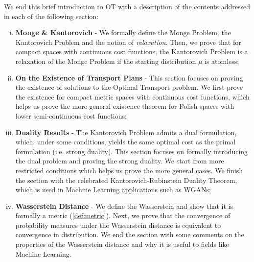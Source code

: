 We end this brief introduction to OT with a description of
the contents addressed in each of the following section:
\begin{enumerate}[(i)]
  \item \textbf{Monge \& Kantorovich} - We formally define the Monge Problem, the Kantorovich Problem
  and the notion of \textit{relaxation}. Then, we prove that for compact spaces with continuous cost functions,
  the Kantorovich Problem is a relaxation of the Monge Problem if the starting distribution $\mu$ is atomless;

  \item \textbf{On the Existence of Transport Plans} - This section focuses on
  proving the existence of solutions to the Optimal Transport problem.
  We first prove the existence for compact
  metric spaces with continuous cost functions, which helps us prove the more general
  existence theorem for Polish spaces with lower semi-continuous cost functions;
  
  \item \textbf{Duality Results} - The Kantorovich Problem
  admits a dual formulation, which, under some conditions, yields the same
  optimal cost as the primal formulation (i.e. strong duality). 
  This section focuses on formally introducing the dual problem and proving
  the strong duality. We start from more restricted conditions which helps us prove
  the more general cases. We finish the section with the celebrated Kantorovich-Rubinstein Duality
  Theorem, which is used in Machine Learning applications such as WGANs;

  \item \textbf{Wasserstein Distance} - We define the Wasserstein
  and show that it is formally a metric (\ref{def:metric}). Next, we prove that the convergence
  of probability measures under the Wasserstein distance is equivalent to convergence in distribution.
  We end the section with some comments on the properties of the Wasserstein distance and why
  it is useful to fields like Machine Learning.
\end{enumerate}